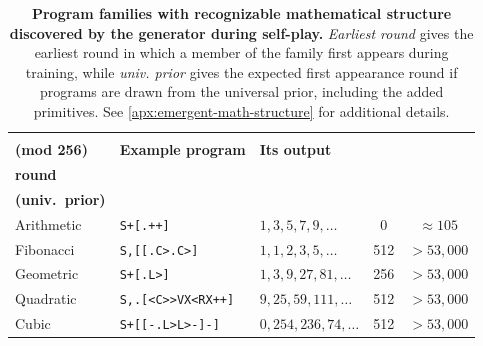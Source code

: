 
\begin{table}[ht]
\centering
\footnotesize
\setlength{\tabcolsep}{4pt}
\begin{tabular}{lllcc}
\toprule
\makecell{\textbf{Family}\\\textbf{(mod 256)}} &
\textbf{Example program} & 
\textbf{Its output} &
\makecell{\textbf{Earliest}\\\textbf{round}} &
\makecell{$\mathbb{E}[\text{first round}]$\\\textbf{(univ.\ prior)}} \\
\midrule
Arithmetic & \texttt{S+[.++]}            & $1,3,5,7,9,\ldots$    & 0   & $\approx 105$ \\
Fibonacci  & \texttt{S,[[.C>.C>]}        & $1,1,2,3,5,\ldots$    & 512 & $>53{,}000$ \\
Geometric  & \texttt{S+[.L>]}            & $1,3,9,27,81,\ldots$  & 256 & $>53{,}000$ \\
Quadratic  & \texttt{S,.[<C>{}>VX<RX++]} & $9,25,59,111,\ldots$  & 512 & $>53{,}000$ \\
Cubic      & \texttt{S+[[-.L>L>-]-]}     & $0,254,236,74,\ldots$ & 512 & $>53{,}000$ \\
\bottomrule
\end{tabular}
\vspace{6pt}
\caption{\textbf{Program families with recognizable mathematical structure discovered by the generator during self-play.}  
\emph{Earliest round} gives the earliest round in which a member of the family first appears during training, while \emph{univ. prior} gives the expected first appearance round if programs are drawn from the universal prior, including the added primitives. See \cref{apx:emergent-math-structure} for additional details.}
\label{tab: discovered-math-structure}
\end{table}
